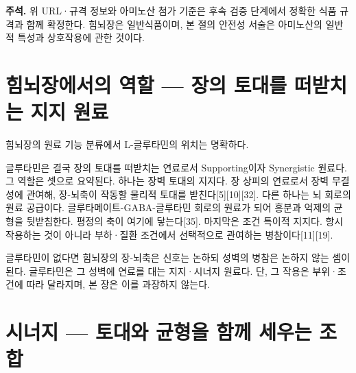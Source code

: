 \documentclass[12pt,oneside]{book}
\newenvironment{authnote}
  {\par\smallskip\begingroup\leftskip=6mm\rightskip=3mm\small\color{muted}\noindent\ignorespaces}
  {\par\endgroup\smallskip}
\begin{document}
\begin{authnote}\textbf{주석.} 위 URL·규격 정보와 아미노산 첨가 기준은 후속 검증 단계에서 정확한 식품 규격과 함께 확정한다. 힘뇌장은 일반식품이며, 본 절의 안전성 서술은 아미노산의 일반적 특성과 상호작용에 관한 것이다.\end{authnote}

\section{힘뇌장에서의 역할 — 장의 토대를 떠받치는 지지 원료}

힘뇌장의 원료 기능 분류에서 L-글루타민의 위치는 명확하다.

\vspace{2pt}\vspace{3pt}

글루타민은 결국 장의 토대를 떠받치는 연료로서 Supporting이자 Synergistic 원료다. 그 역할은 셋으로 요약된다. 하나는 장벽 토대의 지지다. 장 상피의 연료로서 장벽 무결성에 관여해, 장-뇌축이 작동할 물리적 토대를 받친다[5][10][32]. 다른 하나는 뇌 회로의 원료 공급이다. 글루타메이트-GABA-글루타민 회로의 원료가 되어 흥분과 억제의 균형을 뒷받침한다. 평정의 축이 여기에 닿는다[35]. 마지막은 조건 특이적 지지다. 항시 작용하는 것이 아니라 부하·질환 조건에서 선택적으로 관여하는 병참이다[11][19].

글루타민이 없다면 힘뇌장의 장-뇌축은 신호는 논하되 성벽의 병참은 논하지 않는 셈이 된다. 글루타민은 그 성벽에 연료를 대는 지지·시너지 원료다. 단, 그 작용은 부위·조건에 따라 달라지며, 본 장은 이를 과장하지 않는다.

\section{시너지 — 토대와 균형을 함께 세우는 조합}
\end{document}
